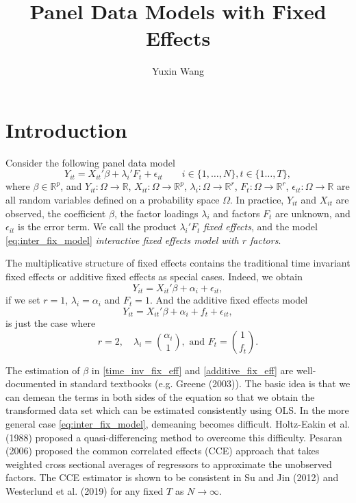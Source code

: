 \documentclass[a4paper]{article}
\title{Panel Data Models with Fixed Effects}
\author{Yuxin Wang}
\newcommand{\IR}[0]{\mathbb{R}}
\begin{document}
\maketitle



\section{Introduction}
Consider the following panel data model
\begin{equation}
\label{eq:inter_fix_model}
Y_{it}=X_{it}'\beta+\lambda_i'F_t+\epsilon_{it} \qquad i \in \{1,\ldots,N\}, t\in\{1\ldots, T\},
\end{equation}
where $\beta \in \IR^p$, and $Y_{it}:\Omega \to \IR$, $X_{it}:\Omega \to \IR^p$, $\lambda_i:\Omega \to \IR^r$, $F_t: \Omega \to \IR^r$, $\epsilon_{it}: \Omega \to \IR$ are all random variables defined on a probability space $\Omega$. In practice, $Y_{it}$ and $X_{it}$ are observed, the coefficient $\beta$, the factor loadings $\lambda_i$ and factors $F_t$ are unknown, and $\epsilon_{it}$ is the error term. We call the product $\lambda_i'F_t$ \textit{fixed effects}, and the model \ref{eq:inter_fix_model} \textit{interactive fixed effects model with $r$ factors}.

The multiplicative structure of fixed effects contains the traditional time invariant fixed effects or additive fixed effects as special cases.
Indeed, we obtain
\begin{equation}\label{time_inv_fix_eff}
	Y_{it}=X_{it}'\beta+\alpha_i+\epsilon_{it},
\end{equation}
if we set $r=1$, $\lambda_i=\alpha_i$ and $F_t=1$. And the additive fixed effects model
\begin{equation}\label{additive_fix_eff}
	Y_{it}=X_{it}'\beta+\alpha_i+f_t+\epsilon_{it},
\end{equation}
is just the case where
\[
r=2, \quad \lambda_i=\binom{\alpha_i}{1}, \text{ and } F_t=\binom{1}{f_t}.
\]

The estimation of $\beta$ in \eqref{time_inv_fix_eff} and \eqref{additive_fix_eff} are well-documented in standard textbooks (e.g. Greene (2003)). The basic idea is that we can demean the terms in both sides of the equation so that we obtain the transformed data set which can be estimated consistently using OLS. In the more general case \eqref{eq:inter_fix_model}, demeaning becomes difficult. Holtz-Eakin et al. (1988) proposed a quasi-differencing method to overcome this difficulty. Pesaran (2006) proposed the common correlated effects (CCE) approach that takes weighted cross sectional averages of regressors to approximate the unobserved factors. The CCE estimator is shown to be consistent in Su and Jin (2012) and Westerlund et al. (2019) for any fixed $T$ as $N \to \infty$.
\end{document}

